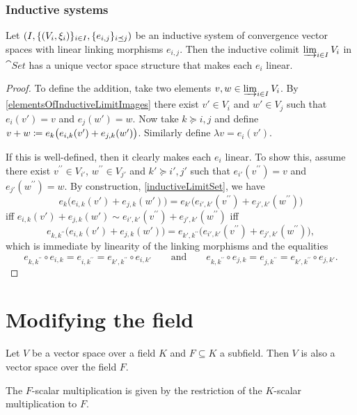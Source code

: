 \subsubsection{Inductive systems}
\begin{proposition} \label{vectorSpaceInductiveLimit}
Let $\sSet{I, \{\sSet{V_i, \xi_i}\}_{i\in I}, \{e_{i,j}\}_{i\preceq j}}$ be an inductive system of convergence vector spaces with linear linking morphisms $e_{i,j}$. Then the inductive colimit $\varinjlim_{i\in I} V_i$ in $\cat{Set}$ has a unique vector space structure that makes each $e_i$ linear.
\end{proposition}
\begin{proof}
To define the addition, take two elements $v,w\in \varinjlim_{i\in I} V_i$. By \ref{elementsOfInductiveLimitImages} there exist $v'\in V_i$ and $w'\in V_j$ such that $e_i(v') = v$ and $e_j(w') = w$. Now take $k \succeq i,j$ and define $v+w \coloneqq e_k\big(e_{i,k}(v') + e_{j,k}(w')\big)$. Similarly define $\lambda v = e_i(v')$.

If this is well-defined, then it clearly makes each $e_i$ linear. To show this, assume there exist $v^{\prime\prime}\in V_{i'}$, $w^{\prime\prime}\in V_{j'}$ and $k' \succeq i',j'$ such that $e_{i'}(v^{\prime\prime}) = v$ and $e_{j'}(w^{\prime\prime}) = w$. By construction, \ref{inductiveLimitSet}, we have
\[ e_k\big(e_{i,k}(v') + e_{j,k}(w')\big) = e_{k'}\big(e_{i',k'}(v^{\prime\prime}) + e_{j',k'}(w^{\prime\prime})\big) \]
iff $e_{i,k}(v') + e_{j,k}(w') \sim e_{i',k'}(v^{\prime\prime}) + e_{j',k'}(w^{\prime\prime})$ iff 
\[ e_{k,k^{\prime\prime}}\big(e_{i,k}(v') + e_{j,k}(w')\big) = e_{k',k^{\prime\prime}}\big(e_{i',k'}(v^{\prime\prime}) + e_{j',k'}(w^{\prime\prime})\big), \]
which is immediate by linearity of the linking morphisms and the equalities
\[ e_{k,k^{\prime\prime}} \circ e_{i,k} = e_{i,k^{\prime\prime}} = e_{k',k^{\prime\prime}} \circ e_{i,k'} \qquad\text{and}\qquad e_{k,k^{\prime\prime}} \circ e_{j,k} = e_{j,k^{\prime\prime}} = e_{k',k^{\prime\prime}} \circ e_{j,k'}. \]
\end{proof}

\section{Modifying the field}
\begin{proposition} \label{subfieldVectorSpace}
Let $V$ be a vector space over a field $K$ and $F\subseteq K$ a subfield. Then $V$ is also a vector space over the field $F$. 
\end{proposition}
The $F$-scalar multiplication is given by the restriction of the $K$-scalar multiplication to $F$.

